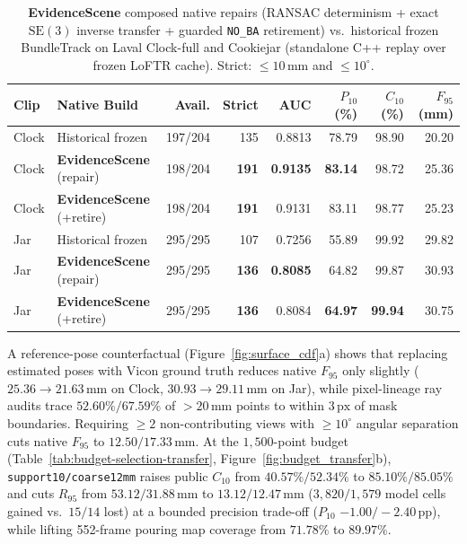 \documentclass{evidencescene}
\begin{document}
\begin{table}[t]\centering\footnotesize
\caption{\textbf{EvidenceScene} composed native repairs (RANSAC determinism + exact $\mathrm{SE}(3)$ inverse transfer + guarded \texttt{NO\_BA} retirement) vs.\ historical frozen BundleTrack on Laval Clock-full and Cookiejar (standalone C++ replay over frozen LoFTR cache). Strict: $\le 10\,\mathrm{mm}$ and $\le 10^\circ$.}\label{tab:composed-native-public}
\begin{tabular}{@{}llrrrrrr@{}}\toprule
Clip & Native Build & Avail. & Strict & AUC & $P_{10}$ (\%) & $C_{10}$ (\%) & $F_{95}$ (mm)\\\midrule
Clock & Historical frozen & 197/204 & 135 & 0.8813 & 78.79 & 98.90 & 20.20\\
Clock & \textbf{EvidenceScene} (repair) & 198/204 & \textbf{191} & \textbf{0.9135} & \textbf{83.14} & 98.72 & 25.36\\
\rowcolor{esrow}
Clock & \textbf{EvidenceScene} (+retire) & 198/204 & \textbf{191} & 0.9131 & 83.11 & 98.77 & 25.23\\\midrule
Jar & Historical frozen & 295/295 & 107 & 0.7256 & 55.89 & 99.92 & 29.82\\
Jar & \textbf{EvidenceScene} (repair) & 295/295 & \textbf{136} & \textbf{0.8085} & 64.82 & 99.87 & 30.93\\
\rowcolor{esrow}
Jar & \textbf{EvidenceScene} (+retire) & 295/295 & \textbf{136} & 0.8084 & \textbf{64.97} & \textbf{99.94} & 30.75\\
\bottomrule\end{tabular}\end{table}

A reference-pose counterfactual (Figure~\ref{fig:surface_cdf}a) shows that replacing estimated poses with Vicon ground truth reduces native $F_{95}$ only slightly ($25.36\to 21.63\,\mathrm{mm}$ on Clock, $30.93\to 29.11\,\mathrm{mm}$ on Jar), while pixel-lineage ray audits trace $52.60\%/67.59\%$ of $>20\,\mathrm{mm}$ points to within $3\,\mathrm{px}$ of mask boundaries. Requiring $\ge 2$ non-contributing views with $\ge 10^\circ$ angular separation cuts native $F_{95}$ to $12.50/17.33\,\mathrm{mm}$. At the $1{,}500$-point budget (Table~\ref{tab:budget-selection-transfer}, Figure~\ref{fig:budget_transfer}b), \texttt{support10/coarse12mm} raises public $C_{10}$ from $40.57\%/52.34\%$ to $\mathbf{85.10\%/85.05\%}$ and cuts $R_{95}$ from $53.12/31.88\,\mathrm{mm}$ to $\mathbf{13.12/12.47\,\mathrm{mm}}$ ($3{,}820/1{,}579$ model cells gained vs.\ $15/14$ lost) at a bounded precision trade-off ($P_{10}$ $-1.00/-2.40\,\mathrm{pp}$), while lifting 552-frame pouring map coverage from $71.78\%$ to $\mathbf{89.97\%}$.
\end{document}
